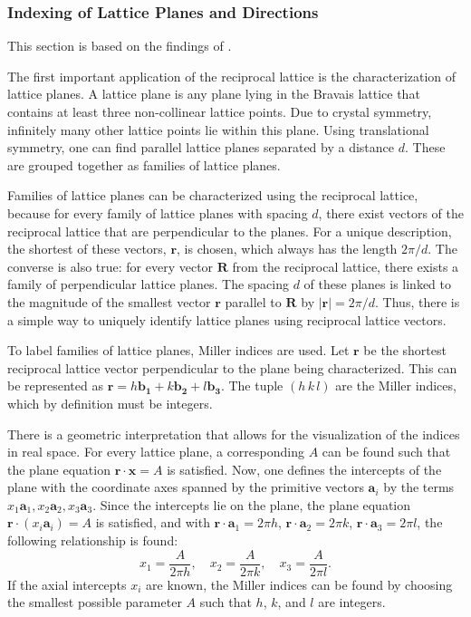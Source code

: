 \subsubsection{Indexing of Lattice Planes and Directions}\label{subsubsec:indexing}
This section is based on the findings of  \autocite{Ashcroft}.

The first important application of the reciprocal lattice is the characterization of lattice planes.
A lattice plane is any plane lying in the Bravais lattice that contains at least three non-collinear lattice points.
Due to crystal symmetry, infinitely many other lattice points lie within this plane.
Using translational symmetry, one can find parallel lattice planes separated by a distance $d$.
These are grouped together as families of lattice planes.

Families of lattice planes can be characterized using the reciprocal lattice, because for every
family of lattice planes with spacing $d$, there exist vectors of the reciprocal lattice that are perpendicular to the planes.
For a unique description, the shortest of these vectors, $\mathbf{r}$, is chosen, which always has the length $2 \pi / d$.
The converse is also true: for every vector $\mathbf{R}$ from the reciprocal lattice, there exists a family of perpendicular
lattice planes.
The spacing $d$ of these planes is linked to the magnitude of the smallest vector $\mathbf{r}$ parallel to $\mathbf{R}$ by
$\lvert \mathbf{r}\rvert=2\pi  /d$.
Thus, there is a simple way to uniquely identify lattice planes using reciprocal lattice vectors.

To label families of lattice planes, Miller indices are used.
Let $\mathbf{r}$ be the shortest reciprocal lattice vector perpendicular to the plane being characterized.
This can be represented as $ \mathbf{r} = h \mathbf{b_1} + k \mathbf{b_2} + l \mathbf{b_3}$.
The tuple $(h\, k\,l)$ are the Miller indices, which by definition must be integers.

There is a geometric interpretation that allows for the visualization of the indices in real space.
For every lattice plane, a corresponding $A$ can be found such that the plane equation $\mathbf{r} \cdot \mathbf{x} = A$
is satisfied.
Now, one defines the intercepts of the plane with the coordinate axes spanned by the primitive vectors $\mathbf{a}_i$ by the terms $x_{1}\mathbf{a}_{1}, x_{2}\mathbf{a}_{2}, x_{3}\mathbf{a}_{3}$.
Since the intercepts lie on the plane, the plane equation $\mathbf{r}\cdot(x_{i}\mathbf{a}_{i})=A$ is satisfied, and
with $\mathbf{r}\cdot\mathbf{a}_{1}=2\pi h$, $\mathbf{r}\cdot \mathbf{a}_{2}=2\pi k$,
$ \mathbf{r}\cdot \mathbf{a}_{3}=2\pi l$, the following relationship is found:
\begin{equation}
    x_{1}=\frac{A}{2\pi h}, \quad x_{2}=\frac{A}{2\pi k}, \quad x_{3} =\frac{A}{2\pi l}.
\end{equation}
If the axial intercepts $x_i$ are known, the Miller indices can be found by choosing the smallest possible parameter $A$
such that $h$, $k$, and $l$ are integers.

